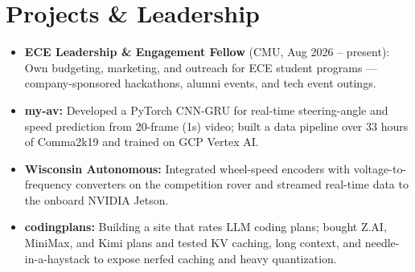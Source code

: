 \documentclass[11pt, letterpaper]{article}
\begin{document}
\section{Projects \& Leadership}
\begin{itemize}
  \item \textbf{ECE Leadership \& Engagement Fellow} (CMU, Aug 2026 -- present): Own budgeting, marketing, and outreach for ECE student programs --- company-sponsored hackathons, alumni events, and tech event outings.
  \item \textbf{my-av:} Developed a PyTorch CNN-GRU for real-time steering-angle and speed prediction from 20-frame (1s) video; built a data pipeline over 33 hours of Comma2k19 and trained on GCP Vertex AI.
  \item \textbf{Wisconsin Autonomous:} Integrated wheel-speed encoders with voltage-to-frequency converters on the competition rover and streamed real-time data to the onboard NVIDIA Jetson.
  \item \textbf{codingplans:} Building a site that rates LLM coding plans; bought Z.AI, MiniMax, and Kimi plans and tested KV caching, long context, and needle-in-a-haystack to expose nerfed caching and heavy quantization.
\end{itemize}
\end{document}
